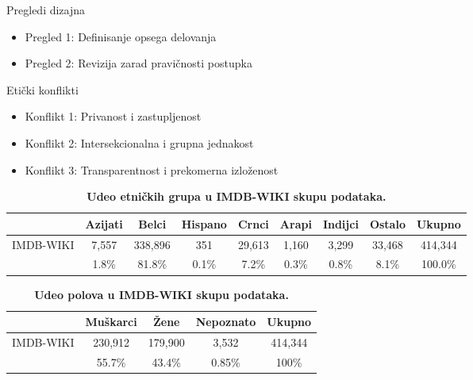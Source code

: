 \documentclass{beamer}
\begin{document}
	\begin{frame}{Pregledi dizajna}
		\begin{itemize}
			\item Pregled 1: Definisanje opsega delovanja
			\item Pregled 2: Revizija zarad pravičnosti postupka
		\end{itemize}
	\end{frame}

	\begin{frame}{Etički konflikti}
		\begin{itemize}
			\item Konflikt 1: Privanost i zastupljenost
			\item Konflikt 2: Intersekcionalna i grupna jednakost
			\item Konflikt 3: Transparentnost i prekomerna izloženost		
		\end{itemize}
	\end{frame}

	\begin{frame}
		\begin{table}[h!]
			\centering
			\caption{\textbf{Udeo etničkih grupa u IMDB-WIKI skupu podataka.}}
			\begin{tabular}{c|cccccccc} \toprule
				{} & {Azijati} & {Belci} & {Hispano} & {Crnci} & {Arapi} & {Indijci} & {Ostalo} & {Ukupno} \\ \midrule
				{IMDB-WIKI} & 7,557 & 338,896 & 351 & 29,613 & 1,160 & 3,299 & 33,468 & 414,344 \\
				{} & 1.8\% & 81.8\% & 0.1\% & 7.2\% & 0.3\% & 0.8\% & 8.1\% & 100.0\% \\ \bottomrule
			\end{tabular}
			\label{table:ethnicity-imdb-wiki}
		\end{table}
	\end{frame}
	
	\begin{frame}
		\begin{table}[h!]
			\centering
			\caption{\textbf{Udeo polova u IMDB-WIKI skupu podataka.}}
			\begin{tabular}{ccccc} \toprule
				{} & {Muškarci} & {Žene} & {Nepoznato} & {Ukupno} \\ \midrule
				{IMDB-WIKI} & 230,912 & 179,900 & 3,532 & 414,344 \\
				{} & 55.7\% & 43.4\% & 0.85\% & 100\% \\ \bottomrule
			\end{tabular}
			\label{table:gender-imdb-wiki}
		\end{table}
	\end{frame}
\end{document}
